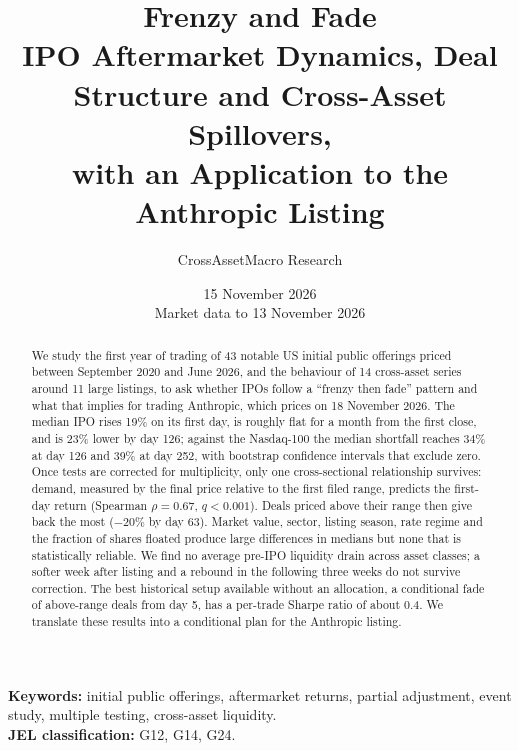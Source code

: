 \documentclass[11pt]{article}
\title{\vspace{-1.2em}\textbf{Frenzy and Fade}\\[0.3em]
\large IPO Aftermarket Dynamics, Deal Structure and Cross-Asset Spillovers,\\ with an Application to the Anthropic Listing}
\author{CrossAssetMacro Research}
\date{15 November 2026\\[0.2em]\small Market data to 13 November 2026}
\begin{document}
\maketitle
\thispagestyle{fancy}

\begin{abstract}
\noindent We study the first year of trading of 43 notable US initial public offerings priced between September 2020 and June 2026, and the behaviour of 14 cross-asset series around 11 large listings, to ask whether IPOs follow a ``frenzy then fade'' pattern and what that implies for trading Anthropic, which prices on 18 November 2026. The median IPO rises 19\% on its first day, is roughly flat for a month from the first close, and is 23\% lower by day 126; against the Nasdaq-100 the median shortfall reaches 34\% at day 126 and 39\% at day 252, with bootstrap confidence intervals that exclude zero. Once tests are corrected for multiplicity, only one cross-sectional relationship survives: demand, measured by the final price relative to the first filed range, predicts the first-day return (Spearman $\rho=0.67$, $q<0.001$). Deals priced above their range then give back the most ($-20\%$ by day 63). Market value, sector, listing season, rate regime and the fraction of shares floated produce large differences in medians but none that is statistically reliable. We find no average pre-IPO liquidity drain across asset classes; a softer week after listing and a rebound in the following three weeks do not survive correction. The best historical setup available without an allocation, a conditional fade of above-range deals from day 5, has a per-trade Sharpe ratio of about 0.4. We translate these results into a conditional plan for the Anthropic listing.
\end{abstract}

\noindent\textbf{Keywords:} initial public offerings, aftermarket returns, partial adjustment, event study, multiple testing, cross-asset liquidity.\\
\noindent\textbf{JEL classification:} G12, G14, G24.
\end{document}
